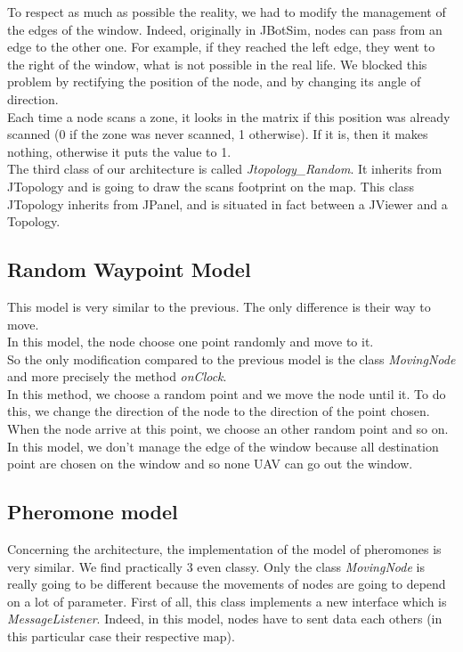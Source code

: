 To respect as much as possible the reality, we had to modify the management of the edges of the window. Indeed, originally in JBotSim, nodes can pass from an edge to the other one. For example, if they reached the left edge, they went to the right of the window, what is not possible in the real life. We blocked this problem by rectifying the position of the node, and by changing its angle of direction.\\

Each time a node scans a zone, it looks in the matrix if this position was already scanned (0 if the zone was never scanned, 1 otherwise). If it is, then it makes nothing, otherwise it puts the value to 1.\\

The third class of our architecture is called \textit{Jtopology\_Random}. It inherits from JTopology and is going to draw the scans footprint on the map. This class JTopology inherits from JPanel, and is situated in fact between a JViewer and a Topology.

\subsection{Random Waypoint Model}

This model is very similar to the previous. The only difference is their way to move.\\
In this model, the node choose one point randomly and move to it.\\
So the only modification compared to the previous model is the class \textit{MovingNode} and more precisely the method \textit{onClock}.\\
In this method, we choose a random point and we move the node until it. To do this, we change the direction of the node to the direction of the point chosen. When the node arrive at this point, we choose an other random point and so on.\\
In this model, we don't manage the edge of the window because all destination point are chosen on the window and so none UAV can go out the window.

\subsection{Pheromone model}

Concerning the architecture, the implementation of the model of pheromones is very similar. We find practically 3 even classy. Only the class \textit{MovingNode} is really going to be different because the movements of nodes are going to depend on a lot of parameter. First of all, this class implements a new interface which is \textit{MessageListener}. Indeed, in this model, nodes have to sent data each others (in this particular case their respective map).\\

